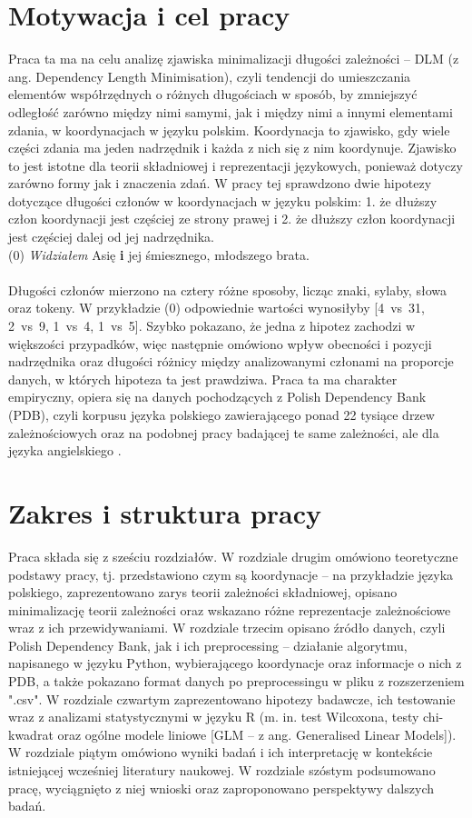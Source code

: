 \documentclass[licencjacka]{pracamgr_Kogni}
\begin{document}
\section{Motywacja i cel pracy}
Praca ta ma na celu analizę zjawiska minimalizacji długości zależności – DLM (z ang. Dependency Length Minimisation), czyli tendencji do umieszczania elementów współrzędnych o różnych długościach w sposób, by zmniejszyć odległość zarówno między nimi samymi, jak i między nimi a innymi elementami zdania, w koordynacjach w języku polskim. Koordynacja to zjawisko, gdy wiele części zdania ma jeden nadrzędnik i każda z nich się z nim koordynuje. Zjawisko to jest istotne dla teorii składniowej i reprezentacji językowych, ponieważ dotyczy zarówno formy jak i znaczenia zdań. W pracy tej sprawdzono dwie hipotezy dotyczące długości członów w koordynacjach w języku polskim: 1. że dłuższy człon koordynacji jest częściej ze strony prawej i 2. że dłuższy człon koordynacji jest częściej dalej od jej nadrzędnika.
\\

(0) \textit{Widziałem} Asię \textbf{i} jej śmiesznego, młodszego brata. \\
\\
Długości członów mierzono na cztery różne sposoby, licząc znaki, sylaby, słowa oraz tokeny. W przykładzie (0) odpowiednie wartości wynosiłyby [4~vs~31, 2~vs~9, 1~vs~4, 1~vs~5]. Szybko pokazano, że jedna z hipotez zachodzi w większości przypadków, więc następnie omówiono wpływ obecności i pozycji nadrzędnika oraz długości różnicy między analizowanymi członami na proporcje danych, w których hipoteza ta jest prawdziwa. Praca ta ma charakter empiryczny, opiera się na danych pochodzących z Polish Dependency Bank (PDB), czyli korpusu języka polskiego zawierającego ponad 22 tysiące drzew zależnościowych oraz na podobnej pracy badającej te same zależności, ale dla języka angielskiego \citep{AnonimoweNieopublikowane}.

\section{Zakres i struktura pracy}
Praca składa się z sześciu rozdziałów. W rozdziale drugim omówiono teoretyczne podstawy pracy, tj. przedstawiono czym są koordynacje -- na przykładzie języka polskiego, zaprezentowano zarys teorii zależności składniowej, opisano minimalizację teorii zależności oraz wskazano różne reprezentacje zależnościowe wraz z ich przewidywaniami. W rozdziale trzecim opisano źródło danych, czyli Polish Dependency Bank, jak i ich preprocessing -- działanie algorytmu, napisanego w języku Python, wybierającego koordynacje oraz informacje o nich z PDB, a także pokazano format danych po preprocessingu w pliku z rozszerzeniem ".csv". W rozdziale czwartym zaprezentowano hipotezy badawcze, ich testowanie wraz z analizami statystycznymi w języku R (m. in. test Wilcoxona, testy chi-kwadrat oraz ogólne modele liniowe [GLM – z ang. Generalised Linear Models]). W rozdziale piątym omówiono wyniki badań i ich interpretację w kontekście istniejącej wcześniej literatury naukowej. W rozdziale szóstym podsumowano pracę, wyciągnięto z niej wnioski oraz zaproponowano perspektywy dalszych badań. 
\end{document}
